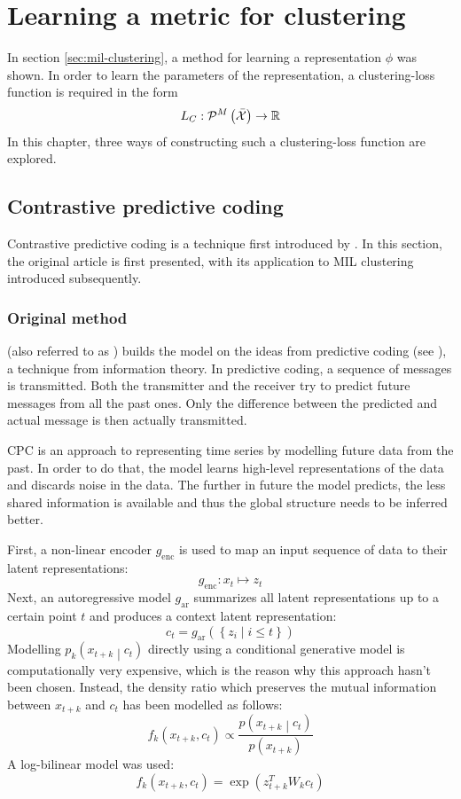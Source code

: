 \chapter{Learning a metric for clustering}\label{chap:clustering-metric}
In section \ref{sec:mil-clustering}, a method for learning a representation \( \phi \) was shown. In order to learn the parameters of the representation, a clustering-loss function is required in the form
\[ L_C : \mathcal{P}^M \left( \bar{\mathcal{X}} \right) \to \mathbb{R} \]
In this chapter, three ways of constructing such a clustering-loss function are explored.

\section{Contrastive predictive coding}
Contrastive predictive coding is a technique first introduced by \cite{oord_representation_2019}. In this section, the original article is first presented, with its application to MIL clustering introduced subsequently.

\subsection{Original method}
 (also referred to as ) builds the model on the ideas from predictive coding (see \cite{elias_predictive_1955}), a technique from information theory. In predictive coding, a sequence of messages is transmitted. Both the transmitter and the receiver try to predict future messages from all the past ones. Only the difference between the predicted and actual message is then actually transmitted.

CPC is an approach to representing time series by modelling future data from the past. In order to do that, the model learns high-level representations of the data and discards noise in the data. The further in future the model predicts, the less shared information is available and thus the global structure needs to be inferred better.

First, a non-linear encoder \( g_\mathrm{enc} \) is used to map an input sequence of data to their latent representations:
\[ g_\mathrm{enc} : x_t \mapsto z_t \]
Next, an autoregressive model \( g_\mathrm{ar} \) summarizes all latent representations up to a certain point \( t \) and produces a context latent representation:
\[ c_t = g_\mathrm{ar} \left( \left\{ z_i \middle| i \leq t \right\} \right) \]
Modelling \( p_k \left( x_{t + k} \middle| c_t \right) \) directly using a conditional generative model is computationally very expensive, which is the reason why this approach hasn't been chosen. Instead, the density ratio which preserves the mutual information between \( x_{t + k} \) and \( c_t \) has been modelled as follows:
\begin{equation}\label{equa:CPC-model}
  f_k \left( x_{t + k}, c_t \right) \propto \frac{p \left( x_{t + k} \middle| c_t \right)}{p \left( x_{t + k} \right)}
\end{equation}
A log-bilinear model was used:
\[ f_k \left( x_{t + k}, c_t \right) = \exp \left( z_{t + k}^T W_k c_t \right) \]

